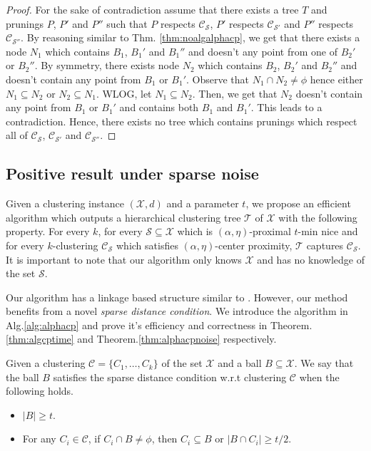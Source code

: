 \documentclass[anon,12pt]{colt2016} %
\newcommand{\mc}{\mathcal}
\begin{document}
\begin{proof}
For the sake of contradiction assume that there exists a tree $T$ and prunings $P$, $P'$ and $P''$ such that $P$ respects $\mc C_{\mc S}$, $P'$ respects $\mc C_{\mc S'}$ and $P''$ respects $\mc C_{\mc S''}$. By reasoning similar to Thm. \ref{thm:noalgalphacp}, we get that there exists a node $N_1$ which contains $B_1$, $B_1'$ and $B_1''$ and doesn't any point from one of $B_2'$ or $B_2''$. By symmetry, there exists node $N_2$ which contains $B_2$, $B_2'$ and $B_2''$ and doesn't contain any point from $B_1$ or $B_1'$. Observe that $N_1 \cap N_2 \neq \phi$ hence either $N_1 \subseteq N_2$ or $N_2 \subseteq N_1$. WLOG, let $N_1 \subseteq N_2$. Then, we get that $N_2$ doesn't contain any point from $B_1$ or $B_1'$ and contains both $B_1$ and $B_1'$. This leads to a contradiction. Hence, there exists no tree which contains prunings which respect all of $\mc C_{\mc S}$, $\mc C_{\mc S'}$ and $\mc C_{\mc S''}$.
\end{proof}


\subsection{Positive result under sparse noise}
\label{section:positiveResultSparseNoise}

Given a clustering instance $(\mc X, d)$ and a parameter $t$, we propose an efficient algorithm which outputs a hierarchical clustering tree $\mc T$ of $\mc X$ with the following property. For every $k$, for every $\mc S \subseteq \mc X$ which is $(\alpha, \eta)$-proximal $t$-min nice and for every $k$-clustering $\mc C_{\mc S}$ which satisfies $(\alpha, \eta)$-center proximity, $\mc T$ captures $\mc C_{\mc S}$. It is important to note that our algorithm only knows $\mc X$ and has no knowledge of the set $\mc S$.


Our algorithm has a linkage based structure similar to \cite{balcan2012clustering}. However, our method benefits from a novel {\it sparse distance condition}. We introduce the algorithm in Alg.\ref{alg:alphacp} and prove it's efficiency and correctness in Theorem. \ref{thm:algcptime} and Theorem.\ref{thm:alphacpnoise} respectively. 

\begin{definition}
	 Given a clustering $\mc C = \{C_1,\ldots,C_k\}$ of the set $\mc X$ and a ball $B \subseteq \mc X$. %
We say that the ball $B$ satisfies the sparse distance condition w.r.t clustering $\mc C$ when the following holds.
\begin{itemize}[noitemsep, leftmargin=*]
\item $|B| \ge t$.
\item For any $C_i \in \mc C$, if $C_i \cap B \neq \phi$, then $C_i \subseteq B$ or $|B \cap C_i| \ge t/2$.
\end{itemize}
\end{definition}
\end{document}
